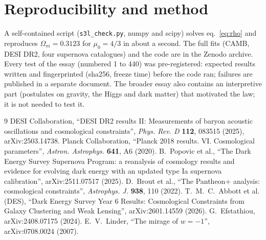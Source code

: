 \documentclass[10pt,a4paper]{article}
\begin{document}
\section{Reproducibility and method}
A self-contained script (\texttt{s3l\_check.py}, numpy and scipy) solves eq.~\eqref{eq:rho} and reproduces $\Omega_m = 0.3123$ for $\mu_0 = 4/3$ in about a second. The full fits (CAMB, DESI DR2, four supernova catalogues) and the code are in the Zenodo archive. Every test of the essay (numbered 1 to 440) was pre-registered: expected results written and fingerprinted (sha256, freeze time) before the code ran; failures are published in a separate document. The broader essay also contains an interpretive part (postulates on gravity, the Higgs and dark matter) that motivated the law; it is not needed to test it.

\small
\begin{thebibliography}{9}\setlength{\itemsep}{0pt}
 DESI Collaboration, ``DESI DR2 results II: Measurements of baryon acoustic oscillations and cosmological constraints'', \emph{Phys. Rev. D} \textbf{112}, 083515 (2025), arXiv:2503.14738.
 Planck Collaboration, ``Planck 2018 results. VI. Cosmological parameters'', \emph{Astron. Astrophys.} \textbf{641}, A6 (2020).
 B.~Popovic et al., ``The Dark Energy Survey Supernova Program: a reanalysis of cosmology results and evidence for evolving dark energy with an updated type Ia supernova calibration'', arXiv:2511.07517 (2025).
 D.~Brout et al., ``The Pantheon+ analysis: cosmological constraints'', \emph{Astrophys. J.} \textbf{938}, 110 (2022).
 T.~M.~C.~Abbott et al. (DES), ``Dark Energy Survey Year 6 Results: Cosmological Constraints from Galaxy Clustering and Weak Lensing'', arXiv:2601.14559 (2026).
 G.~Efstathiou, arXiv:2408.07175 (2024).
 E.~V.~Linder, ``The mirage of $w = -1$'', arXiv:0708.0024 (2007).
\end{thebibliography}
\end{document}

